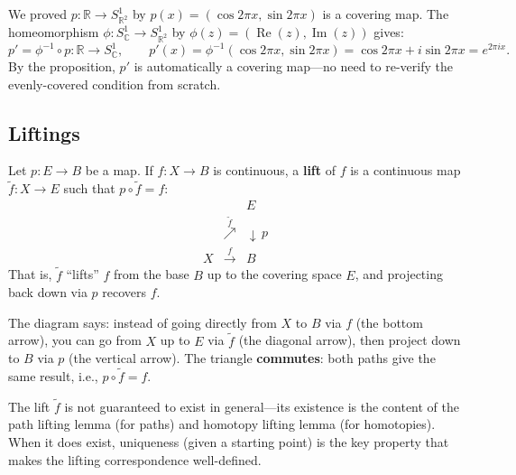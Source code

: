 \documentclass[11pt]{report}
\begin{document}
\begin{exbox}
We proved $p: \mathbb{R} \to S^1_{\mathbb{R}^2}$ by $p(x) = (\cos 2\pi x, \sin 2\pi x)$ is a covering map. The homeomorphism $\phi: S^1_{\mathbb{C}} \to S^1_{\mathbb{R}^2}$ by $\phi(z) = (\operatorname{Re}(z), \operatorname{Im}(z))$ gives:
\[p' = \phi^{-1} \circ p: \mathbb{R} \to S^1_{\mathbb{C}}, \qquad p'(x) = \phi^{-1}(\cos 2\pi x, \sin 2\pi x) = \cos 2\pi x + i\sin 2\pi x = e^{2\pi i x}.\]
By the proposition, $p'$ is automatically a covering map---no need to re-verify the evenly-covered condition from scratch.
\end{exbox}

\subsection{Liftings}

\begin{defbox}[Lift]
Let $p: E \to B$ be a map. If $f: X \to B$ is continuous, a \textbf{lift} of $f$ is a continuous map $\tilde{f}: X \to E$ such that $p \circ \tilde{f} = f$:
\[
\begin{array}{ccc}
& & E \\
& \overset{\tilde{f}}{\nearrow} & \downarrow\, p \\
X & \xrightarrow{\;f\;} & B
\end{array}
\]
That is, $\tilde{f}$ ``lifts'' $f$ from the base $B$ up to the covering space $E$, and projecting back down via $p$ recovers $f$.
\end{defbox}

\begin{rembox}
The diagram says: instead of going directly from $X$ to $B$ via $f$ (the bottom arrow), you can go from $X$ up to $E$ via $\tilde{f}$ (the diagonal arrow), then project down to $B$ via $p$ (the vertical arrow). The triangle \textbf{commutes}: both paths give the same result, i.e., $p \circ \tilde{f} = f$.

The lift $\tilde{f}$ is not guaranteed to exist in general---its existence is the content of the path lifting lemma (for paths) and homotopy lifting lemma (for homotopies). When it does exist, uniqueness (given a starting point) is the key property that makes the lifting correspondence well-defined.
\end{rembox}
\end{document}
